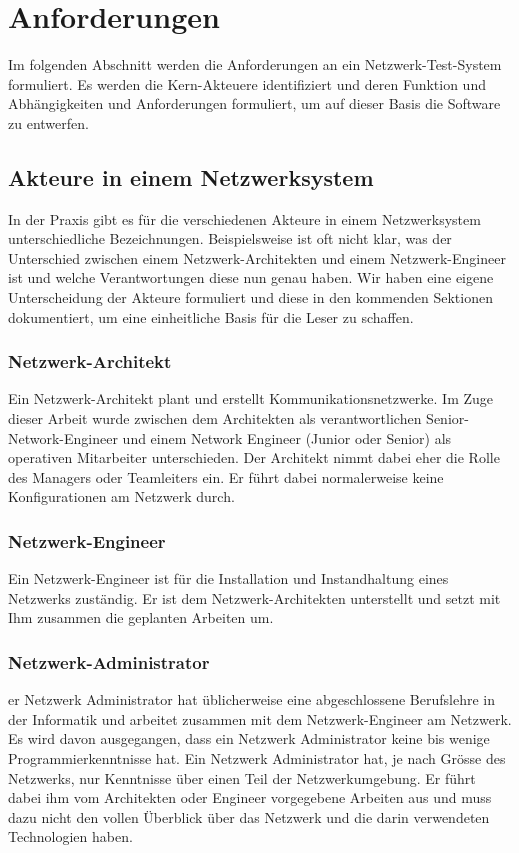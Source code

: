 \documentclass[]{subfiles}
\begin{document}
\section{Anforderungen}
    Im folgenden Abschnitt werden die Anforderungen an ein Netzwerk-Test-System formuliert.
    Es werden die Kern-Akteuere identifiziert und deren Funktion und Abhängigkeiten 
    und Anforderungen formuliert, um auf dieser Basis die Software zu entwerfen.
    
    \subsection{Akteure in einem Netzwerksystem}
    In der Praxis gibt es für die verschiedenen Akteure in einem Netzwerksystem
    unterschiedliche Bezeichnungen. Beispielsweise ist oft nicht klar, was der 
    Unterschied zwischen einem Netzwerk-Architekten und einem Netzwerk-Engineer
    ist und welche Verantwortungen diese nun genau haben. Wir haben eine eigene
    Unterscheidung der Akteure formuliert und diese in den kommenden Sektionen
    dokumentiert, um eine einheitliche Basis für die Leser zu schaffen.

    \subsubsection*{Netzwerk-Architekt}
    Ein Netzwerk-Architekt plant und erstellt Kommunikationsnetzwerke.
    Im Zuge dieser Arbeit wurde zwischen dem Architekten als verantwortlichen
    Senior-Network-Engineer und einem Network Engineer (Junior oder Senior)
    als operativen Mitarbeiter unterschieden. 
    Der Architekt nimmt dabei eher die Rolle des Managers oder Teamleiters ein. 
    Er führt dabei normalerweise keine Konfigurationen am Netzwerk durch.

    \subsubsection*{Netzwerk-Engineer}
    Ein Netzwerk-Engineer ist für die Installation und Instandhaltung 
    eines Netzwerks zuständig. 
    Er ist dem Netzwerk-Architekten unterstellt und setzt mit Ihm
    zusammen die geplanten Arbeiten um. 

    \subsubsection*{Netzwerk-Administrator}
    er Netzwerk Administrator hat üblicherweise eine abgeschlossene Berufslehre 
    in der Informatik und arbeitet zusammen mit dem Netzwerk-Engineer am Netzwerk. 
    Es wird davon ausgegangen, dass ein Netzwerk Administrator keine bis wenige 
    Programmierkenntnisse hat. 
    Ein Netzwerk Administrator hat, je nach Grösse des Netzwerks, 
    nur Kenntnisse über einen Teil der Netzwerkumgebung. 
    Er führt dabei ihm vom Architekten oder Engineer vorgegebene Arbeiten 
    aus und muss dazu nicht den vollen Überblick über das Netzwerk und die 
    darin verwendeten Technologien haben.
\end{document}
